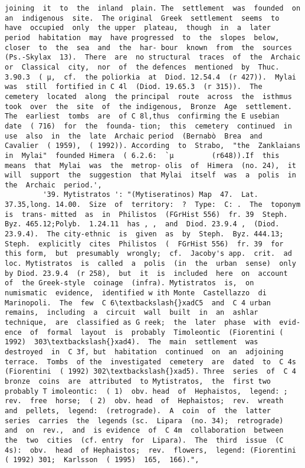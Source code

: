 \documentclass[11pt]{article}
\begin{document}
\begin{Verbatim}[commandchars=\\\{\}]
joining  it  to  the  inland  plain. The  settlement  was  founded  on  an  indigenous  site.  The original  Greek  settlement  seems  to  have  occupied  only  the upper  plateau,  though  in  a  later  period  habitation  may  have progressed  to  the  slopes  below,  closer  to  the  sea  and  the  har- bour  known  from  the  sources  (Ps.-Skylax  13).  There  are  no structural  traces  of  the  Archaic  or  Classical  city,  nor  of  the defences  mentioned  by  Thuc. 3.90.3  ( µ,  cf.  the poliorkia  at  Diod. 12.54.4  (r 427)).  Mylai  was  still  fortified in C 4l  (Diod. 19.65.3  (r 315)).  The  cemetery  located  along  the principal  route  across  the  isthmus  took  over  the  site  of  the indigenous,  Bronze  Age  settlement.  The  earliest  tombs  are  of C 8l,thus  confirming the E usebian  date  ( 716)  for  the  founda- tion;  this  cemetery  continued  in  use  also  in  the  late  Archaic period  (Bernabò  Brea  and  Cavalier  ( 1959),  ( 1992)). According  to  Strabo,  "the  Zanklaians  in  Mylai"  founded Himera  ( 6.2.6:  `µ         (r648)).If  this  means  that  Mylai  was  the  metrop- olis  of  Himera  (no. 24),  it  will  support  the  suggestion  that Mylai  itself  was  a  polis  in  the  Archaic  period.',
         '39. Mytistratos ': "(Mytiseratinos) Map  47.  Lat. 37.35,long. 14.00.  Size  of  territory:  ?  Type:  C: .  The  toponym  is  trans- mitted  as  in  Philistos  (FGrHist 556)  fr. 39  Steph.  Byz. 465.12;Polyb.  1.24.11  has , ,  and  Diod. 23.9.4 ,  (Diod. 23.9.4).  The city-ethnic  is  given  as  by  Steph.  Byz. 444.13; Steph.  explicitly  cites  Philistos  (  FGrHist 556)  fr. 39  for  this form,  but  presumably  wrongly;  cf.  Jacoby's app.  crit.  ad  loc. Mytistratos  is  called  a  polis  (in  the  urban  sense)  only  by Diod. 23.9.4  (r 258),  but  it  is  included  here  on  account  of  the Greek-style  coinage  (infra). Mytistratos  is,  on  numismatic  evidence,  identified w ith Monte  Castellazzo  di  Marinopoli.  The  few  C 6\textbackslash{}xadC5  and  C 4 urban  remains,  including  a  circuit  wall  built  in  an  ashlar technique,  are  classified as G reek;  the  later  phase  with  evid- ence  of  formal  layout  is  probably  Timoleontic  (Fiorentini ( 1992)  303\textbackslash{}xad4).  The  main  settlement  was  destroyed  in  C 3f, but  habitation  continued  on  an  adjoining  terrace.  Tombs  of the  investigated  cemetery  are  dated  to  C 4s  (Fiorentini  ( 1992) 302\textbackslash{}xad5). Three  series  of  C 4  bronze  coins  are  attributed  to Mytistratos,  the  first two probably T imoleontic:  ( 1)  obv. head  of  Hephaistos,  legend: ;  rev.  free  horse;  ( 2)  obv. head  of  Hephaistos;  rev.  wreath  and  pellets,  legend:  (retrograde).  A  coin  of  the  latter  series  carries  the  legends (sc.  Lipara  (no. 34);  retrograde)  and  on  rev.,  and  is evidence  of  C 4m  collaboration  between  the  two  cities  (cf. entry  for  Lipara).  The  third  issue  (C 4s):  obv.  head  of Hephaistos;  rev.  flowers,  legend: (Fiorentini  ( 1992) 301;  Karlsson  ( 1995)  165,  166).",

\end{Verbatim}
\end{document}
